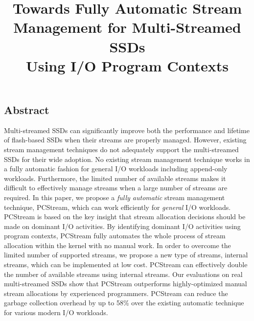 \documentclass[letterpaper, twocolumn, 10pt]{article}
\begin{document}
\title{
\bf Towards Fully Automatic Stream Management for Multi-Streamed SSDs \\ Using I/O Program Contexts}

%


\maketitle
\pagestyle{empty}
\subsection*{Abstract}
Multi-streamed SSDs
can significantly improve both the performance and lifetime of flash-based SSDs
when their streams are properly managed.  
However, existing stream management techniques do not adequately 
support the multi-streamed SSDs for their wide adoption.
No existing stream management technique works in a fully automatic fashion 
for general I/O workloads including append-only workloads.  
Furthermore, the limited number of available
streams makes it difficult to effectively manage streams 
when a large number of streams are required.
In this paper, we propose a {\it fully automatic} stream
management technique, \textsf{\small PCStream}, which can work efficiently for {\it general} I/O workloads.
\textsf{\small PCStream} is based on the key insight that stream allocation decisions should be made on 
dominant I/O activities. By identifying dominant I/O activities using program contexts, 
\textsf{\small PCStream} fully automates the whole process of stream allocation 
within the kernel with no manual work.
In order to overcome the limited number of supported streams, we propose a new 
type of streams, internal streams, which can be implemented at low cost.
\textsf{\small PCStream} can effectively double the number of available streams using internal streams.
Our evaluations on real multi-streamed SSDs show that \textsf{\small PCStream}
outperforms highly-optimized manual stream allocations by experienced 
programmers. \textsf{\small PCStream} can reduce the garbage collection overhead 
by up to 58\% over the existing automatic technique
for various modern I/O workloads.
\end{document}
